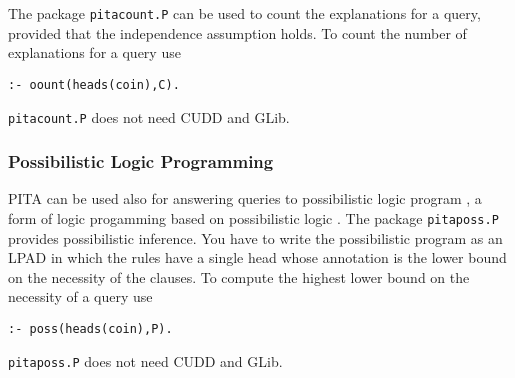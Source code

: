 The package \texttt{pitacount.P} can be used to count the explanations for a query, provided that the independence assumption holds. To count the number of explanations for a query use
\begin{verbatim}
:- oount(heads(coin),C).
\end{verbatim}
\texttt{pitacount.P} does not need CUDD and GLib.

\subsubsection{Possibilistic Logic Programming}
PITA can be used also for answering queries to possibilistic logic program \cite{DBLP:conf/iclp/DuboisLP91}, a form of logic progamming based on possibilistic logic \cite{DubLanPra-poss-94}. The package \texttt{pitaposs.P} provides possibilistic inference. 
You have to write the possibilistic program as an LPAD in which the rules have a single head whose annotation is the lower bound on the  necessity of the clauses. To compute the highest  lower bound on the necessity of a query
use
\begin{verbatim}
:- poss(heads(coin),P).
\end{verbatim}
\texttt{pitaposs.P} does not need CUDD and GLib.

